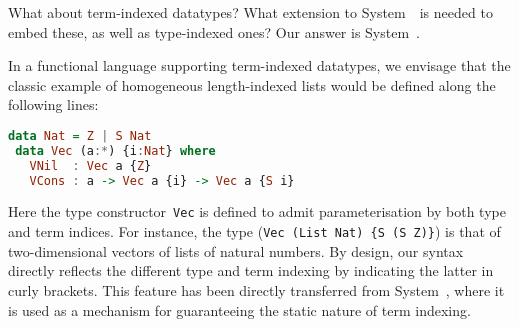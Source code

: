 What about term-indexed datatypes?  What extension to System~\Fw\ is
needed to embed these, as well as type-indexed ones?  Our answer is
System~\Fi.

In a functional language supporting term-indexed datatypes, we envisage
that the classic example of homogeneous length-indexed lists would be
defined along the following lines:
\begin{lstlisting}[basicstyle={\ttfamily},language=Haskell]
 data Nat = Z | S Nat
 data Vec (a:*) {i:Nat} where
   VNil  : Vec a {Z}
   VCons : a -> Vec a {i} -> Vec a {S i}
\end{lstlisting}\noindent
Here the type constructor~{\tt Vec} is defined to admit parameterisation
by both type and term indices.  For instance, the type 
(\verb|Vec (List Nat) {S (S Z)}|) is that of two-dimensional
vectors of lists of natural numbers.  By design, our syntax directly
reflects the different type and term indexing by indicating the latter in
curly brackets.  This feature has been directly transferred from
System~\Fi, where it is used as a mechanism for guaranteeing the static
nature of term indexing.

